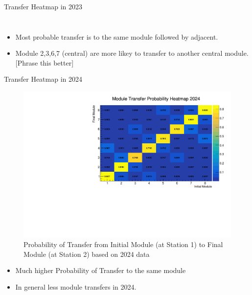 \begin{frame}{Transfer Heatmap in 2023}
\begin{columns}
\begin{column}{0.2\linewidth}
\begin{figure}
            \end{figure}
        \end{column}
    \end{columns}
    \begin{itemize}
        \small
        \item Most probable transfer is to the same module followed by adjacent.
        \item Module 2,3,6,7 (central) are more likey to transfer to another central module. [Phrase this better]
    \end{itemize}
\end{frame}

\begin{frame}{Transfer Heatmap in 2024}
    \begin{figure}
        \includegraphics[width=0.8\linewidth]{./ModuleLevelPlots/st0_module_number vs st1_module_number_prob_2024.pdf}
        \caption{Probability of Transfer from Initial Module (at Station 1) to Final Module (at Station 2) based on 2024 data}
    \end{figure}
    \begin{itemize}
        \small
        \item Much higher Probability of Transfer to the same module
        \item In general less module transfers in 2024.
    \end{itemize}
\end{frame}

